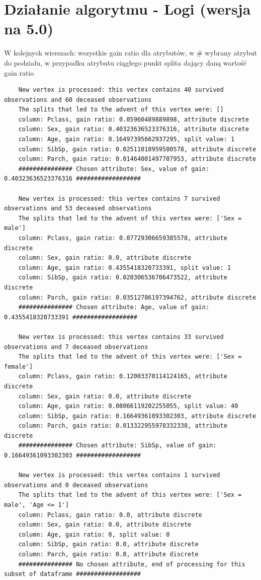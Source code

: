 \documentclass[12pt]{article}
\begin{document}
\section{Działanie algorytmu - Logi (wersja na 5.0)}
W kolejnych wierszach: wszystkie gain ratio dla atrybutów, w \# wybrany atrybut do podziału, w przypadku atrybutu ciągłego punkt splita dający daną wartość gain ratio
\begin{verbatim}
	New vertex is processed: this vertex contains 40 survived observations and 60 deceased observations
	The splits that led to the advent of this vertex were: []
	column: Pclass, gain ratio: 0.05960489889898, attribute discrete
	column: Sex, gain ratio: 0.40323636523376316, attribute discrete
	column: Age, gain ratio: 0.16497395662937295, split value: 1
	column: SibSp, gain ratio: 0.02511018959580578, attribute discrete
	column: Parch, gain ratio: 0.01464001497707953, attribute discrete
	############### Chosen attribute: Sex, value of gain: 0.40323636523376316 ##################
	
	New vertex is processed: this vertex contains 7 survived observations and 53 deceased observations
	The splits that led to the advent of this vertex were: ['Sex = male']
	column: Pclass, gain ratio: 0.07729306659385578, attribute discrete
	column: Sex, gain ratio: 0.0, attribute discrete
	column: Age, gain ratio: 0.4355418320733391, split value: 1
	column: SibSp, gain ratio: 0.020306536706473522, attribute discrete
	column: Parch, gain ratio: 0.03512786197394762, attribute discrete
	############### Chosen attribute: Age, value of gain: 0.4355418320733391 ##################
	
	New vertex is processed: this vertex contains 33 survived observations and 7 deceased observations
	The splits that led to the advent of this vertex were: ['Sex = female']
	column: Pclass, gain ratio: 0.12003370114124165, attribute discrete
	column: Sex, gain ratio: 0.0, attribute discrete
	column: Age, gain ratio: 0.08066119202255055, split value: 40
	column: SibSp, gain ratio: 0.16649361093302303, attribute discrete
	column: Parch, gain ratio: 0.013322955978332338, attribute discrete
	############### Chosen attribute: SibSp, value of gain: 0.16649361093302303 ##################
	
	New vertex is processed: this vertex contains 1 survived observations and 0 deceased observations
	The splits that led to the advent of this vertex were: ['Sex = male', 'Age <= 1']
	column: Pclass, gain ratio: 0.0, attribute discrete
	column: Sex, gain ratio: 0.0, attribute discrete
	column: Age, gain ratio: 0, split value: 0
	column: SibSp, gain ratio: 0.0, attribute discrete
	column: Parch, gain ratio: 0.0, attribute discrete
	############### No chosen attribute, end of processing for this subset of dataframe ##################
	

\end{verbatim}
\end{document}
